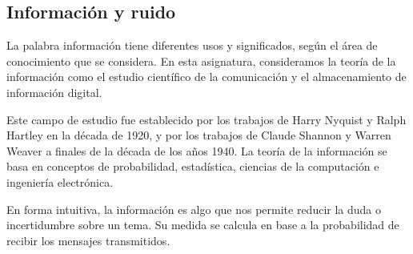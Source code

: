\documentclass[11pt,a4paper,openany]{book}
\begin{document}
\subsection{Información y ruido}

La palabra información tiene diferentes usos y significados, según el área de conocimiento que se considera. En esta asignatura, consideramos la teoría de la información como el estudio científico de la comunicación y el almacenamiento de información digital.

Este campo de estudio fue establecido por los trabajos de Harry Nyquist y Ralph Hartley en la década de 1920, y por los trabajos de Claude Shannon y Warren Weaver a finales de la década de los años 1940. La teoría de la información se basa en conceptos de probabilidad, estadística, ciencias de la computación e ingeniería electrónica.

En forma intuitiva, la información es algo que nos permite reducir la duda o incertidumbre sobre un tema. Su medida se calcula en base a la probabilidad de recibir los mensajes transmitidos.
\end{document}
